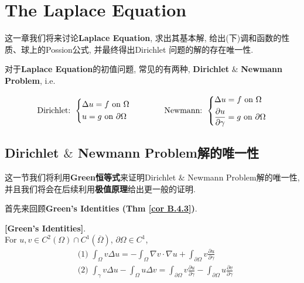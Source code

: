 \ifx\allfiles\undefined


	\else
	\fi
\chapter{The Laplace Equation}

	这一章我们将来讨论\textbf{Laplace Equation}, 求出其基本解, 给出(下)调和函数的性质、球上的Possion公式, 并最终得出Dirichlet 问题的解的存在唯一性. 
	
	\vspace*{1em}
	
	对于\textbf{Laplace Equation}的初值问题, 常见的有两种, \textbf{Dirichlet} $\&$ \textbf{Newmann Problem}, i.e.
	
	\begin{align*}
		\text{Dirichlet: } 
		\begin{dcases*}
			\Delta u = f \,\, \text{on} \,\, \Omega \\
			u = g \,\, \text{on} \,\, \partial \Omega
		\end{dcases*}
		\hspace*{4em}
		\text{Newmann: }
		\begin{dcases*}
			\Delta u = f \,\, \text{on} \,\, \Omega \\
			\frac{\partial u}{\partial \gamma} = g \,\, \text{on} \,\, \partial \Omega
		\end{dcases*}
	\end{align*}
	
\vspace*{2em}

\section{Dirichlet $\&$ Newmann Problem解的唯一性}
	
	这一节我们将利用\textbf{Green恒等式}来证明Dirichlet $\&$ Newmann Problem解的唯一性, 并且我们将会在后续利用\textbf{极值原理}给出更一般的证明. 
	
	\vspace*{1em}
	
	首先来回顾\textbf{Green's Identities (Thm \ref{cor B.4.3})}. 
	
	\vspace*{1em}
	
	\begin{proposition}\label{prop 3.1.1}
		\textbf{[Green's Identities]}. \\
		For $u , v \in C^2 (\Omega) \cap C^1 \left( \overline{\Omega} \right)$, $\partial \Omega \in C^1$, 
		\begin{align*}
			&\text{(1)} \,\, 
			\int_{\Omega} v \Delta u = -\int_{\Omega} \nabla v \cdot \nabla u + \int_{\partial \Omega} v \frac{\partial u}{\partial \gamma} \\
			&\text{(2)} \,\, 
			\int_{\gamma} v \Delta u - \int_{\Omega} u \Delta v = \int_{\partial \Omega} v \frac{\partial u}{\partial \gamma} - \int_{\partial \Omega} u \frac{\partial v}{\partial \gamma}
		\end{align*}
	\end{proposition}
	
